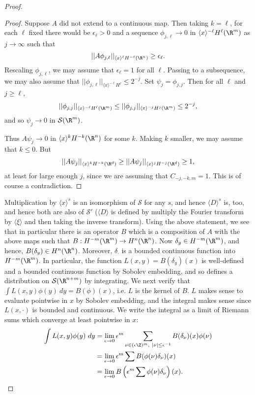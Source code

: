\documentclass[12pt]{article}
\begin{document}
\begin{proof}
\begin{proof}
Suppose $A$ did not extend to a continuous map. Then taking $k=\ell$, for each $\ell$ fixed there would be $\epsilon_\ell > 0$ and a sequence $\phi_{j,\ell} \to 0$ in $\langle x \rangle^{-\ell}H^{\ell}(\R^m)$ as $j \to \infty$ such that
\[||A\phi_{j,\ell}||_{\langle x \rangle^{\ell}H^{-\ell}(\R^n)} \geq \epsilon_\ell.\] Rescaling $\phi_{j,\ell}$, we may assume that $\epsilon_\ell = 1$ for all $\ell$. Passing to a subsequence, we may also assume that $||\phi_{j,\ell}||_{\langle x \rangle^{-\ell}H^{\ell}} \leq 2^{-j}$. Set $\psi_j = \phi_{j,j}$. Then for all $\ell$ and $j \geq \ell$,
\[||\phi_{j,j}||_{\langle x \rangle^{-\ell}H^\ell(\R^m)} \leq ||\phi_{j,j}||_{\langle x \rangle^{-j}H^j(\R^m)} \leq 2^{-j},\]
and so $\psi_j \to 0$ in $\mathcal S(\R^m)$. 

Thus $A\psi_j \to 0$ in $\langle x \rangle^{k}H^{-k}(\R^n)$ for some $k$. Making $k$ smaller, we may assume that $k \leq 0$.
But 
\[||A\psi_j||_{\langle x \rangle^{k}H^{-k}(\R^d)} \geq ||A\psi_j||_{\langle x \rangle^{j}H^{-j}(\R^d)} \geq 1,\]
at least for large enough $j$, since we are assuming that $C_{-j,-k,m} = 1$. This is of course a contradiction.\end{proof}

Multiplication by $\langle x \rangle^s$ is an isomorphism of $\mathcal S$ for any $s$, and hence $\langle D \rangle^s$ is, too, and hence both are also of $\mathcal S'$ ($\langle D \rangle$ is defined by multiply the Fourier transform by $\langle \xi\rangle$ and then taking the inverse transform). Using the above statement, we see that in particular there is an operator $B$ which is a composition of $A$ with the above maps such that $B:H^{-m}(\R^m) \to H^n(\R^n)$. Now $\delta_y \in H^{-m}(\R^m)$, and hence, $B(\delta_y) \in H^n(\R^n)$. Moreover, $\delta_\cdot$ is a bounded continuous function into $H^{-m}(\R^m)$. In particular, the function $L(x,y) = B(\delta_y)(x)$ is well-defined and a bounded continuous function by Sobolev embedding, and so defines a distribution on $\mathcal S(\R^{n+m})$ by integrating. We next verify that $\int L(x,y)\phi(y)\ dy = B(\phi)(x)$, i.e. $L$ is the kernel of $B$. $L$ makes sense to evaluate pointwise in $x$ by Sobolev embedding, and the integral makes sense since $L(x,\cdot)$ is bounded and continuous. We write the integral as a limit of Riemann sums which converge at least pointwise in $x$:
\begin{align*}
\int L(x,y)\phi(y)\ dy &= \lim_{\epsilon \to 0} \epsilon^m\sum_{\nu \in (\epsilon\Z)^m,\ |\nu| \leq \epsilon^{-1}}B(\delta_\nu)(x)\phi(\nu)\\
&= \lim_{\epsilon \to 0}\epsilon^m\sum B(\phi(\nu)\delta_\nu)(x)\\
&= \lim_{\epsilon \to 0}B\left(\epsilon^m \sum \phi(\nu)\delta_\nu\right)(x).\end{align*}


\end{proof}
\end{document}
